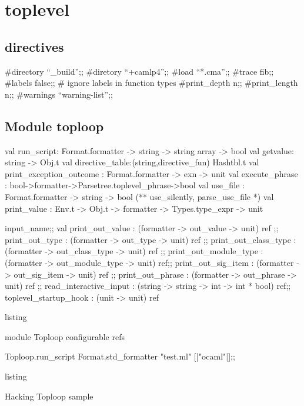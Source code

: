 

\section{toplevel}

\subsection{directives}

\begin{bashcode}
  #directory ``_build'';;
  #diretory ``+camlp4'';;
  #load ``*.cma'';;
  #trace fib;;
  #labels false;;  # ignore labels in function types
  #print_depth n;;
  #print_length n;;
  #warnings ``warning-list'';;
\end{bashcode}  

\subsection{Module toploop}

\begin{ocamlcode}
  val run_script: Format.formatter -> string -> string array -> bool
  val getvalue: string -> Obj.t
  val directive_table:(string,directive_fun) Hashtbl.t
  val print_exception_outcome : Format.formatter -> exn -> unit 
  val execute_phrase :
  bool->formatter->Parsetree.toplevel_phrase->bool
  val use_file : Format.formatter -> string -> bool
  (** use_silently, parse_use_file *)
  val print_value : Env.t -> Obj.t -> formatter ->
  Types.type_expr ->  unit
\end{ocamlcode}

\begin{ocamlcode}
  input_name;;
  val print_out_value : (formatter -> out_value -> unit) ref ;;
  print_out_type  : (formatter -> out_type -> unit) ref ;;
  print_out_class_type : (formatter -> out_class_type -> unit) ref ;;
  print_out_module_type : (formatter -> out_module_type -> unit) ref;;
  print_out_sig_item : (formatter -> out_sig_item -> unit) ref ;;
  print_out_phrase : (formatter -> out_phrase -> unit) ref ;;
  read_interactive_input :  (string -> string -> int -> int * bool)  ref;;
  toplevel_startup_hook : (unit -> unit) ref 
\end{ocamlcode}
\caption{listing}{module Toploop configurable refs}

\begin{ocamlcode}
Toploop.run_script Format.std_formatter "test.ml" [|"ocaml"|];;
\end{ocamlcode}
\caption{listing}{Hacking Toploop sample}


